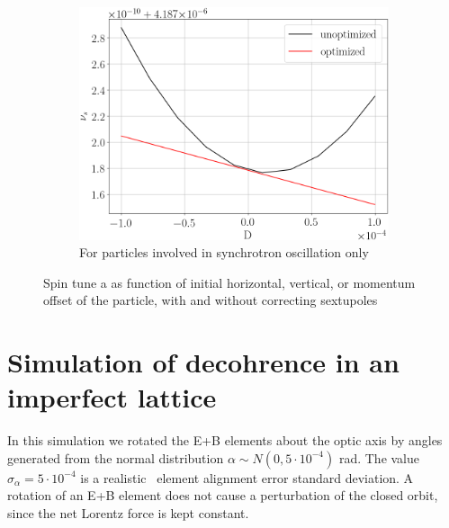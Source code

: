 \documentclass[a4paper]{jacow}
\newcommand{\subwidth}{.9\linewidth}
\begin{document}
\begin{figure}[ht]
\begin{subfigure}{\subwidth}
    \centering
    \includegraphics[width=\linewidth]{../img/IPAC19/spin_tune_decoh_d_offset}
    \caption{For particles involved in synchrotron oscillation only\label{fig:st_decoh_synchrotron}}
  \end{subfigure}
  \caption{Spin tune a as function of initial horizontal, vertical, or momentum offset of the particle, with and without correcting sextupoles\label{fig:decoherence_suppression_sim}}
\end{figure}

\section{Simulation of decohrence in an imperfect lattice}
In this simulation we rotated the E+B elements about the optic axis by angles generated from the normal distribution $\alpha \sim N(0, 5\cdot 10^{-4})$ rad. The value $\sigma_\alpha = 5\cdot 10^{-4}$ is a realistic~\cite{Senichev:FDM} element alignment error standard deviation. A rotation of an E+B element does not cause a perturbation of the closed orbit, since the net Lorentz force is kept constant.
\end{document}
